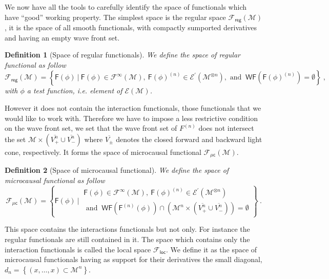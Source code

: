 \documentclass[10pt]{book}
\newcommand{\WF}{\mathsf{WF}}
\newcommand{\Ecal}{\mathcal{E}}
\newcommand{\Fcal}{\mathcal{F}}
\newcommand{\Mcal}{\mathcal{M}}
\newcommand{\Fsf}{\mathsf{F}}
\newcommand{\csf}{\mathsf{c}}
\theoremstyle{break}
\newtheorem{definition}{Definition}
\begin{document}
\bigskip


We now have all the tools to carefully identify the space of functionals which have ``good'' working property. %
The simplest space is the regular space $\mathcal{F}_\mathsf{reg}(\Mcal)$, it is the space of all smooth functionals, with compactly sumported derivatives and having an empty wave front set. %
%
\begin{definition}[Space of regular functionals]
We define the space of regular functional as follow
%
\begin{equation*}
\Fcal_{\mathsf{reg}}(\Mcal) = \left\{ \Fsf(\phi) \ \bigg| \ \Fsf(\phi) \in \Fcal^\infty(\Mcal), \ \Fsf(\phi)^{(n)} \in \Ecal^\prime(\Mcal^{\otimes n}), \mbox{ and } \ \WF(\Fsf(\phi)^{(n)}) = \emptyset \right\} \ ,
\end{equation*}
%
with $\phi$ a test function, i.e. element of $\Ecal(\Mcal)$. 
\end{definition}
%
However it does not contain the interaction functionals, those functionals that we would like to work with. Therefore we have to impose a less restrictive condition on the wave front set, we set that the wave front set of $F^{(n)}$ does not intersect the set $\mathcal{M} \times (\overline{V^n_+} \cup \overline{V^n_-})$ where $\overline{V_\pm}$ denotes the closed forward and backward light cone, respectively. It forms the space of microcausal functional $\mathcal{F}_\mathsf{\mu c}(\Mcal)$.%
%
\begin{definition}[Space of microcausal functional]
We define the space of microcausal functional as follow
%
\begin{equation*}
\Fcal_{\mu\csf}(\Mcal) = \left\{ 
\Fsf(\phi) \ \bigg| \ 
\begin{array}{l}
\Fsf(\phi) \in \Fcal^\infty(\Mcal), \ \Fsf(\phi)^{(n)} \in \Ecal^\prime(\Mcal^{\otimes n}) \\
\mbox{ and } \ \WF(\Fsf^{(n)}(\phi)) \cap \left( \Mcal^n \times ( \overline{V^{n}_{+}} \cup \overline{V^{n}_{-}} ) \right)  = \emptyset 
\end{array}
\right\} \ .
\end{equation*}
%
\end{definition}
%
This space contains the interactions functionals but not only. For instance the regular functionals are still contained in it. The space which contains only the interaction functionals is called the local space $\mathcal{F}_\mathsf{loc}$. We define it as the space of microcausal functionals having as support for their derivatives the small diagonal, $d_n = \left\{ (x,\dots,x) \subset \Mcal^n \right\}$.%
\end{document}
